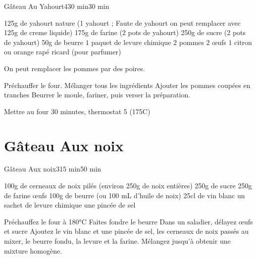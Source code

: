 {\begin{recette}{Gâteau Au Yahourt}{4}{30 min}{30 min}
\begin{ingredients}
\ingredient 125g de yahourt nature (1 yahourt ; Faute de yahourt on peut remplacer avec 125g de creme liquide)
\ingredient 175g de farine (2 pots de yahourt)
\ingredient 250g de sucre (2 pots de yahourt)
\ingredient 50g de beurre
\ingredient $1$ paquet de levure chimique
\ingredient $2$ pommes
\ingredient $2$ œufs
\ingredient $1$ citron ou orange rapé
\ingredient ricard (pour parfumer)
\end{ingredients}

\begin{remarque}
On peut remplacer les pommes par des poires.
\end{remarque}

\begin{preparation}
\etape Préchauffer le four.
\etape Mélanger tous les ingrédients
\etape Ajouter les pommes coupées en tranches
\etape Beurrer le moule, fariner, puis verser la préparation.
\end{preparation}

\begin{cuisson}
Mettre au four 30 minutes, thermostat 5 (175\degres C)
\end{cuisson}
\end{recette}

\section{Gâteau Aux noix}
\begin{recette}{Gâteau Aux noix}{3}{15 min}{50 min}

\begin{ingredients}
\ingredient 100g de cerneaux de noix pilés (environ 250g de noix entières)
\ingredient 250g de sucre
\ingredient 250g de farine
 œufs
\ingredient 100g de beurre (ou 100 mL d'huile de noix)
\ingredient 25cl de vin blanc
\ingredient un sachet de levure chimique
\ingredient une pincée de sel
\end{ingredients}

\begin{preparation}
\etape Préchauffez le four à 180°C
\etape Faites fondre le beurre
\etape Dans un saladier, délayez œufs et sucre
\etape Ajoutez le vin blanc et une pincée de sel, les cerneaux de noix passés au mixer, le beurre fondu, la levure et la 
farine. 
\etape Mélangez jusqu'à obtenir une mixture homogène. 
\end{preparation}


\end{recette}}
